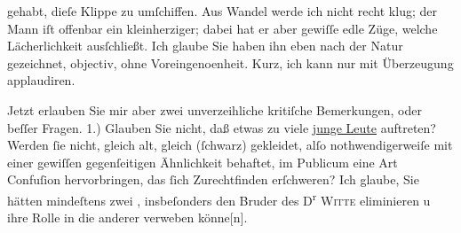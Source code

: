                gehabt, dieſe Klippe zu umſchiffen. Aus Wandel werde ich nicht recht klug; der Mann iſt offenbar
               ein \introOben{}kleinherziger\introOben{}{ }\label{K_L04327-2v}\label{K_L04327-2}; dabei hat
               er aber gewiſſe edle Züge, welche Lächerlichkeit ausſchließt. Ich glaube Sie haben
               ihn eben nach der Natur gezeichnet, objectiv, ohne Voreingeno{\geminationm}enheit. Kurz, ich kann nur mit Überzeugung
               applaudiren.\pend
           
\pstart
           Jetzt erlauben Sie mir aber zwei unverzeihliche kritiſche Bemerkungen, oder beſſer
               Fragen. 1.) Glauben Sie nicht, {\pb}daß
               etwas zu viele \uline{junge Leute} auftreten? Werden{ }ſie
               nicht, gleich alt, gleich (ſchwarz) gekleidet, alſo nothwendigerweiſe mit einer
               gewiſſen gegenſeitigen Ähnlichkeit behaftet, im Publicum eine Art Confuſion
               hervorbringen, das{ }ſich Zurechtfinden erſchweren? Ich glaube, Sie hätten mindeſtens
               zwei , insbeſonders den
               Bruder des D\textsuperscript{r}{ }\textsc{Witte} eliminieren u  ihre Rolle in die anderer
               verweben könne{[}n{]}.\pend
           
